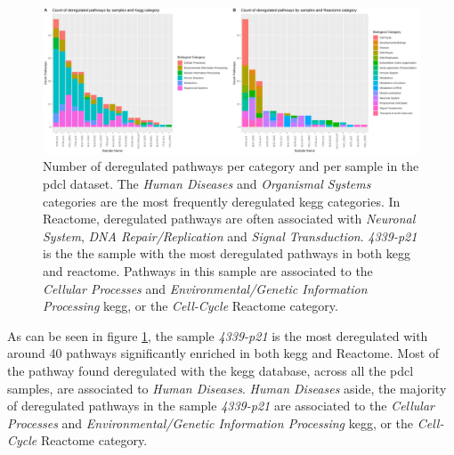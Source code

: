 \begin{figure}
    \includegraphics[width=\textwidth]{img/barplot-categ-pdcl}
    \caption{
        Number of deregulated pathways per category and per sample in the \acrshort{pdcl} dataset.
        The  \textit{Human Diseases} and \textit{Organismal Systems} categories are the most frequently deregulated \acrshort{kegg} categories.
        In Reactome, deregulated pathways are often associated with \textit{Neuronal System}, \textit{DNA Repair/Replication} and \textit{Signal Transduction}.
        \textit{4339-p21} is the the sample with the most deregulated pathways in both \acrshort{kegg} and reactome.
        Pathways in this sample are associated to the \textit{Cellular Processes} and \textit{Environmental/Genetic Information Processing} \acrshort{kegg}, or the \textit{Cell-Cycle} Reactome category.
    }
    \label{fig:barplot-categ-pdcl}
\end{figure}

As can be seen in figure \ref*{fig:barplot-categ-pdcl}, the sample \textit{4339-p21} is the most deregulated with around 40 pathways significantly enriched in both \acrshort{kegg} and Reactome.
Most of the pathway found deregulated with the \acrshort{kegg} database, across all the \acrshort{pdcl} samples, are associated to \textit{Human Diseases}.
\textit{Human Diseases} aside, the majority of deregulated pathways in the sample \textit{4339-p21} are associated to the \textit{Cellular Processes} and \textit{Environmental/Genetic Information Processing} \acrshort{kegg}, or the \textit{Cell-Cycle} Reactome category.